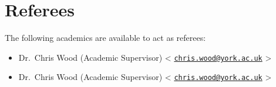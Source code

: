 \documentclass{article}
\makeatletter
\newcommand{\todomark}{\color{red}{\textbf{[TODO]}}}
\newcommand{\yorkemail}[2]{%
        #1
        \textless%
        \href{mailto:#2@york.ac.uk}{\texttt{#2@york.ac.uk}}%
        \textgreater%
}
\makeatother
\begin{document}
\section{Referees}
The following academics are available to act as referees:
\begin{itemize}
        \item \yorkemail{Dr.\ Chris Wood (Academic Supervisor)}{chris.wood}
        \item \yorkemail{Dr.\ Chris Wood (Academic Supervisor)}{chris.wood}
        \todomark%
\end{itemize}
%
\end{document}
